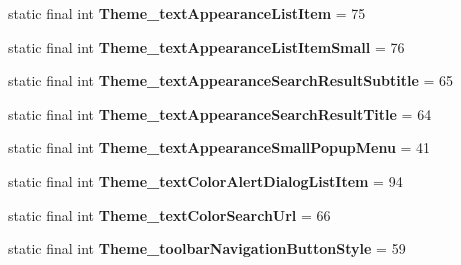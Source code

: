 \begin{DoxyCompactItemize}
\item 
\hypertarget{classandroid_1_1support_1_1design_1_1_r_1_1styleable_a2820dae17eb4cffa12d89a80ebfa52cf}{}static final int {\bfseries Theme\+\_\+text\+Appearance\+List\+Item} = 75\label{classandroid_1_1support_1_1design_1_1_r_1_1styleable_a2820dae17eb4cffa12d89a80ebfa52cf}

\item 
\hypertarget{classandroid_1_1support_1_1design_1_1_r_1_1styleable_a8a665bd405f09d531107202848a4d77c}{}static final int {\bfseries Theme\+\_\+text\+Appearance\+List\+Item\+Small} = 76\label{classandroid_1_1support_1_1design_1_1_r_1_1styleable_a8a665bd405f09d531107202848a4d77c}

\item 
\hypertarget{classandroid_1_1support_1_1design_1_1_r_1_1styleable_a9dd78ddf728965e7e0ff47d63e704027}{}static final int {\bfseries Theme\+\_\+text\+Appearance\+Search\+Result\+Subtitle} = 65\label{classandroid_1_1support_1_1design_1_1_r_1_1styleable_a9dd78ddf728965e7e0ff47d63e704027}

\item 
\hypertarget{classandroid_1_1support_1_1design_1_1_r_1_1styleable_a2e98f5dc67495211a74556d4a35ba244}{}static final int {\bfseries Theme\+\_\+text\+Appearance\+Search\+Result\+Title} = 64\label{classandroid_1_1support_1_1design_1_1_r_1_1styleable_a2e98f5dc67495211a74556d4a35ba244}

\item 
\hypertarget{classandroid_1_1support_1_1design_1_1_r_1_1styleable_a0802ada4ade353b0cfeef1cdab305ca8}{}static final int {\bfseries Theme\+\_\+text\+Appearance\+Small\+Popup\+Menu} = 41\label{classandroid_1_1support_1_1design_1_1_r_1_1styleable_a0802ada4ade353b0cfeef1cdab305ca8}

\item 
\hypertarget{classandroid_1_1support_1_1design_1_1_r_1_1styleable_af71c296db215b3687eaf851d61e3dfe2}{}static final int {\bfseries Theme\+\_\+text\+Color\+Alert\+Dialog\+List\+Item} = 94\label{classandroid_1_1support_1_1design_1_1_r_1_1styleable_af71c296db215b3687eaf851d61e3dfe2}

\item 
\hypertarget{classandroid_1_1support_1_1design_1_1_r_1_1styleable_a41497184f6121d19433c8641e85b3927}{}static final int {\bfseries Theme\+\_\+text\+Color\+Search\+Url} = 66\label{classandroid_1_1support_1_1design_1_1_r_1_1styleable_a41497184f6121d19433c8641e85b3927}

\item 
\hypertarget{classandroid_1_1support_1_1design_1_1_r_1_1styleable_a767084da010ec7c7d0e62b03720ff390}{}static final int {\bfseries Theme\+\_\+toolbar\+Navigation\+Button\+Style} = 59\label{classandroid_1_1support_1_1design_1_1_r_1_1styleable_a767084da010ec7c7d0e62b03720ff390}


\end{DoxyCompactItemize}
